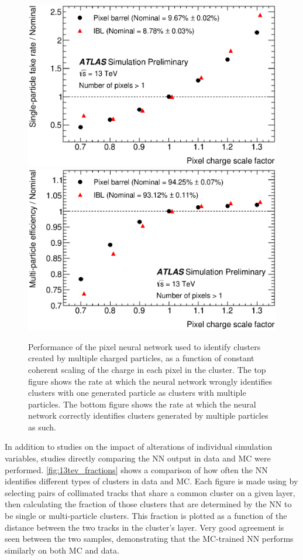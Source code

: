 \begin{centering}
\begin{figure}[bth]
\myfloatalign
\includegraphics[width=.9\linewidth]{figures/nn/fig_05a.eps}
\includegraphics[width=.9\linewidth]{figures/nn/fig_05b.eps}
\caption{Performance of the pixel neural network used to identify clusters created by multiple charged particles, as a function of constant coherent scaling of the charge in each pixel in the cluster. The top figure shows the rate at which the neural network wrongly identifies clusters with one generated particle as clusters with multiple particles. The bottom figure shows the rate at which the neural network correctly identifies clusters generated by multiple particles as such.}
\label{fig:13tev_charge_robustness}
\end{figure}
\end{centering}

In addition to studies on the impact of alterations of individual simulation variables, studies directly comparing the \ac{NN} output in data and \ac{MC} were performed. \autoref{fig:13tev_fractions} shows a comparison of how often the \ac{NN} identifies different types of clusters in data and \ac{MC}. Each figure is made using by selecting pairs of collimated tracks that share a common cluster on a given layer, then calculating the fraction of those clusters that are determined by the \ac{NN} to be single or multi-particle clusters. This fraction is plotted as a function of the distance between the two tracks in the cluster's layer. Very good agreement is seen between the two samples, demonstrating that the \ac{MC}-trained \ac{NN} performs similarly on both \ac{MC} and data.

